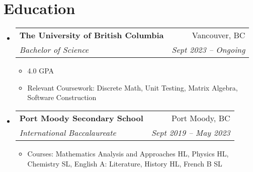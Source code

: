 \documentclass[letterpaper,11pt]{article}
\makeatletter
\newcommand{\resumeItem}[1]{
  \item\small{
    {#1 \vspace{-2pt}}
  }
}
\newcommand{\resumeSubheading}[4]{
  \vspace{-2pt}\item
    \begin{tabular*}{0.97\textwidth}[t]{l@{\extracolsep{\fill}}r}
      \textbf{#1} & #2 \\
      \textit{\small#3} & \textit{\small #4} \\
    \end{tabular*}\vspace{-7pt}
}
\newcommand{\resumeSubHeadingListStart}{\begin{itemize}[leftmargin=0.15in, label={}]}
\newcommand{\resumeSubHeadingListEnd}{\end{itemize}}
\newcommand{\resumeItemListStart}{\begin{itemize}}
\newcommand{\resumeItemListEnd}{\end{itemize}\vspace{-5pt}}
\makeatother
\begin{document}
\section{Education}
  \resumeSubHeadingListStart
    \resumeSubheading
      {The University of British Columbia}{Vancouver, BC}
      {Bachelor of Science}{Sept 2023 -- Ongoing}
      \resumeItemListStart
        \resumeItem{4.0 GPA}
        \resumeItem{Relevant Coursework: Discrete Math, Unit Testing, Matrix Algebra, Software Construction}
      \resumeItemListEnd
    \resumeSubheading
      {Port Moody Secondary School}{Port Moody, BC}
      {International Baccalaureate}{Sept 2019 -- May 2023}
      \resumeItemListStart
        \resumeItem{Courses: Mathematics Analysis and Approaches HL, Physics HL, Chemistry SL, \newline English A: Literature, History HL, French B SL}
      \resumeItemListEnd
  \resumeSubHeadingListEnd


\end{document}
